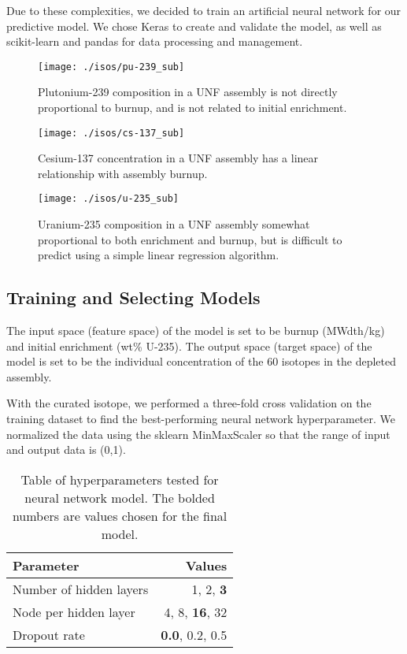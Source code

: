 Due to these complexities, we decided to train an artificial
neural network for our predictive model. We chose
Keras to create and validate the model, as well as scikit-learn
and pandas for data processing and management.


\begin{figure}
    \centering
    \texttt{[image: ./isos/pu-239\_sub]}
    \caption{Plutonium-239 composition in a \gls{UNF} assembly
             is not directly proportional to burnup, and is
             not related to initial enrichment.}
    \label{fig:pu_239}
\end{figure}


\begin{figure}
    \centering
    \texttt{[image: ./isos/cs-137\_sub]}
    \caption{Cesium-137 concentration in a \gls{UNF} assembly
             has a linear relationship with assembly burnup.}
    \label{fig:cs_137}
\end{figure}

\begin{figure}
    \centering
    \texttt{[image: ./isos/u-235\_sub]}
    \caption{Uranium-235 composition in a \gls{UNF} assembly
             somewhat proportional to both enrichment and
             burnup, but is difficult to predict using
             a simple linear regression algorithm.}
    \label{fig:u_235}
\end{figure}


\subsection{Training and Selecting Models}

The input space (feature space) of the model is set to
be burnup (MWdth/kg) and initial enrichment (wt\% U-235).
The output space (target space) of the model is set to
be the individual concentration of the 60 isotopes in the
depleted assembly.

With the curated isotope, we performed a three-fold
cross validation on the training dataset to find the
best-performing neural network hyperparameter. We
normalized the data using the sklearn MinMaxScaler
so that the range of input and output data is (0,1).

\begin{table}[h]
    \centering
    \begin{tabular}{lr}
        \hline
        Parameter & Values \\
        \hline
        Number of hidden layers & 1, 2, \textbf{3} \\
        Node per hidden layer & 4, 8, \textbf{16}, 32 \\
        Dropout rate & \textbf{0.0}, 0.2, 0.5 \\
        \hline
    \end{tabular}
    \caption{Table of hyperparameters tested
             for neural network model. The bolded
             numbers are values chosen for the final model.}
\end{table}

